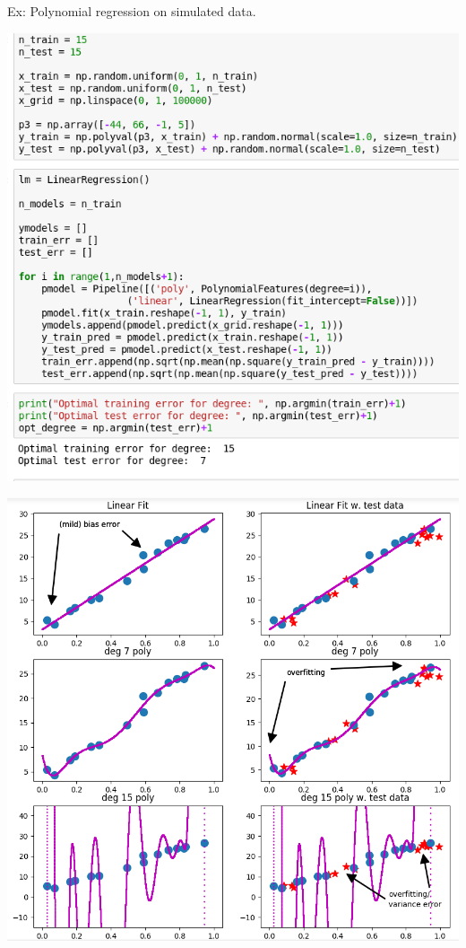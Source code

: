 \documentclass[12pt,t]{beamer}
\begin{document}
\begin{frame}

Ex: Polynomial regression on simulated data.

\centerline{
\includegraphics[height=0.9\textheight]{./images/biasvsvariance_code.png}
} 
\end{frame}

\begin{frame}

\centerline{
\includegraphics[height=1\textheight]{./images/biasvsvariance_fits.png}
} 

\end{frame}
\end{document}
